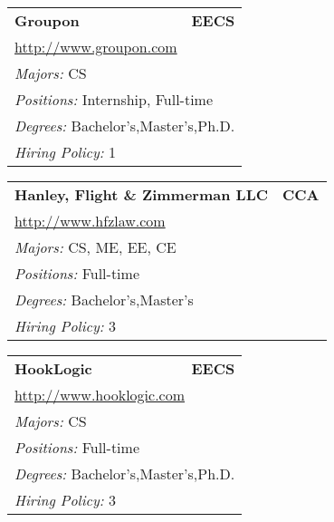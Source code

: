 \documentclass[twoside]{article}
\begin{document}
\begin{center}
\begin{multicols}{3}
\begin{FlushLeft}
\begin{minipage}{\columnwidth}
\end{minipage}
 
\begin{minipage}{\columnwidth}\begin{tabularx}{.95\columnwidth}{Xr}
                 {\Large\bf Groupon} & {\Large\bf EECS}\\
    \multicolumn{2}{p{.95\columnwidth}}{\url{http://www.groupon.com}}\\
    \multicolumn{2}{p{.95\columnwidth}}{\emph{Majors:} CS}\\
    \multicolumn{2}{p{.95\columnwidth}}{\emph{Positions:} Internship, Full-time}\\
    \multicolumn{2}{p{.95\columnwidth}}{\emph{Degrees:} Bachelor's,Master's,Ph.D.}\\
    \multicolumn{2}{p{.95\columnwidth}}{\emph{Hiring Policy:} 1}\\
    \end{tabularx}
    
\end{minipage}
 
\begin{minipage}{\columnwidth}\begin{tabularx}{.95\columnwidth}{Xr}
                 {\Large\bf Hanley, Flight \& Zimmerman LLC} & {\Large\bf CCA}\\
    \multicolumn{2}{p{.95\columnwidth}}{\url{http://www.hfzlaw.com}}\\
    \multicolumn{2}{p{.95\columnwidth}}{\emph{Majors:} CS, ME, EE, CE}\\
    \multicolumn{2}{p{.95\columnwidth}}{\emph{Positions:} Full-time}\\
    \multicolumn{2}{p{.95\columnwidth}}{\emph{Degrees:} Bachelor's,Master's}\\
    \multicolumn{2}{p{.95\columnwidth}}{\emph{Hiring Policy:} 3}\\
    \end{tabularx}
    
\end{minipage}
 
\begin{minipage}{\columnwidth}\begin{tabularx}{.95\columnwidth}{Xr}
                 {\Large\bf HookLogic} & {\Large\bf EECS}\\
    \multicolumn{2}{p{.95\columnwidth}}{\url{http://www.hooklogic.com}}\\
    \multicolumn{2}{p{.95\columnwidth}}{\emph{Majors:} CS}\\
    \multicolumn{2}{p{.95\columnwidth}}{\emph{Positions:} Full-time}\\
    \multicolumn{2}{p{.95\columnwidth}}{\emph{Degrees:} Bachelor's,Master's,Ph.D.}\\
    \multicolumn{2}{p{.95\columnwidth}}{\emph{Hiring Policy:} 3}\\
    \end{tabularx}
    

\end{minipage}
\end{FlushLeft}
\end{multicols}
\end{center}
\end{document}
